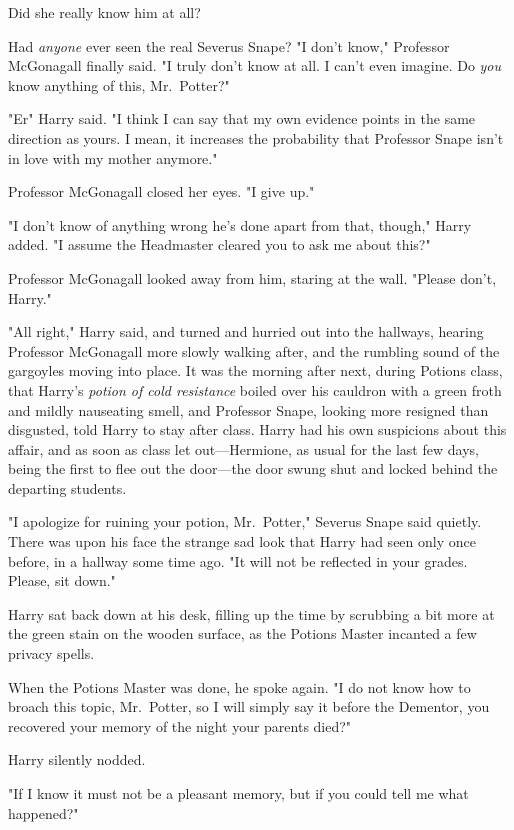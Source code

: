 Did she really know him at all?

Had \emph{anyone} ever seen the real Severus Snape?
\sbreak
"I don't know," Professor McGonagall finally said. "I truly don't know at all.
I can't even imagine. Do \emph{you} know anything of this, Mr.~Potter?"

"Er{\el}" Harry said. "I think I can say that my own evidence points in the
same direction as yours. I mean, it increases the probability that Professor
Snape isn't in love with my mother anymore."

Professor McGonagall closed her eyes. "I give up."

"I don't know of anything wrong he's done apart from that, though," Harry
added. "I assume the Headmaster cleared you to ask me about this?"

Professor McGonagall looked away from him, staring at the wall. "Please don't,
Harry."

"All right," Harry said, and turned and hurried out into the hallways, hearing
Professor McGonagall more slowly walking after, and the rumbling sound of the
gargoyles moving into place.
\sbreak
It was the morning after next, during Potions class, that Harry's \emph{potion
of cold resistance} boiled over his cauldron with a green froth and mildly
nauseating smell, and Professor Snape, looking more resigned than disgusted,
told Harry to stay after class. Harry had his own suspicions about this affair,
and as soon as class let out---Hermione, as usual for the last few days, being
the first to flee out the door---the door swung shut and locked behind the
departing students.

"I apologize for ruining your potion, Mr.~Potter," Severus Snape said quietly.
There was upon his face the strange sad look that Harry had seen only once
before, in a hallway some time ago. "It will not be reflected in your grades.
Please, sit down."

Harry sat back down at his desk, filling up the time by scrubbing a bit more at
the green stain on the wooden surface, as the Potions Master incanted a few
privacy spells.

When the Potions Master was done, he spoke again. "I{\el} do not know how to
broach this topic, Mr.~Potter, so I will simply say it{\el} before the
Dementor, you recovered your memory of the night your parents died?"

Harry silently nodded.

"If{\el} I know it must not be a pleasant memory, but{\el} if you could
tell me what happened\el?"

